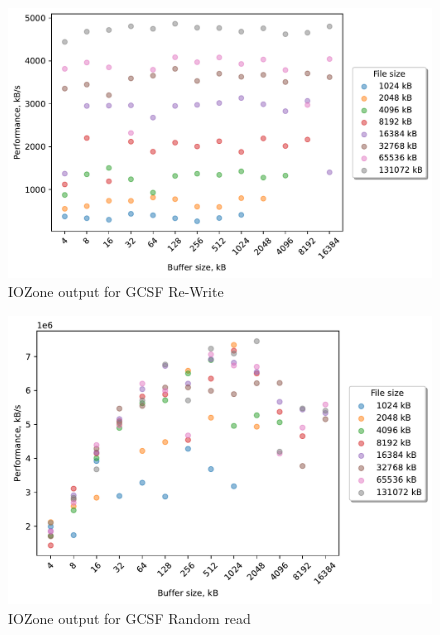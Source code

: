 \begin{figure}[!htb]
	\label{fig:bench_gcsf_re_write}
	\begin{center}
		\includegraphics[width=1.0\textwidth]{figures/benchmarking/gcsf/Re-Write.pdf}
	\end{center}
	\caption{IOZone output for GCSF \mbox{Re-Write}}
\end{figure}

\begin{figure}[!htb]
	\label{fig:bench_gcsf_rnd_read}
	\begin{center}
		\includegraphics[width=1.0\textwidth]{figures/benchmarking/gcsf/Random read.pdf}
	\end{center}
	\caption{IOZone output for GCSF Random read}
\end{figure}

